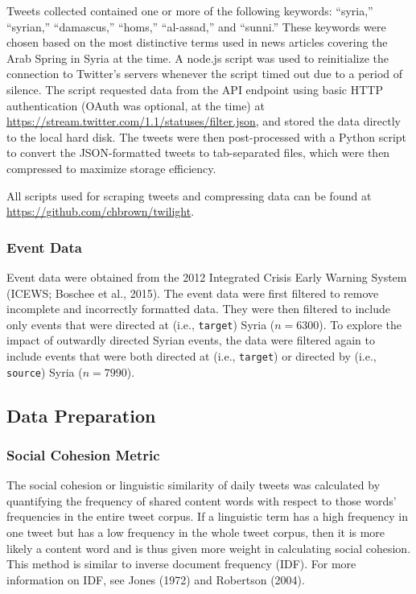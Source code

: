 \documentclass[english,man]{apa6}
\begin{document}
Tweets collected contained one or more of the following keywords:
\enquote{syria,} \enquote{syrian,} \enquote{damascus,} \enquote{homs,} \enquote{al-assad,} and \enquote{sunni.} These
keywords were chosen based on the most distinctive terms used in news
articles covering the Arab Spring in Syria at the time. A node.js script
was used to reinitialize the connection to Twitter's servers whenever the
script timed out due to a period of silence. The script requested data from
the API endpoint using basic HTTP authentication (OAuth was optional, at
the time) at \url{https://stream.twitter.com/1.1/statuses/filter.json}, and stored
the data directly to the local hard disk. The tweets were then post-processed
with a Python script to convert the JSON-formatted tweets to tab-separated
files, which were then compressed to maximize storage efficiency.

All scripts used for scraping tweets and compressing data can be found
at \url{https://github.com/chbrown/twilight}.

\hypertarget{event-data}{%
\subsubsection{Event Data}\label{event-data}}

Event data were obtained from the 2012 Integrated Crisis Early Warning
System (ICEWS; Boschee et al., 2015). The event data were first filtered to
remove incomplete and incorrectly formatted data. They were then filtered
to include only events that were directed at (i.e., \texttt{target}) Syria (\(n = 6300\)).
To explore the impact of outwardly directed Syrian events, the data were
filtered again to include events that were both directed at (i.e., \texttt{target})
or directed by (i.e., \texttt{source}) Syria (\(n = 7990\)).

\hypertarget{data-preparation}{%
\subsection{Data Preparation}\label{data-preparation}}

\hypertarget{social-cohesion-metric}{%
\subsubsection{Social Cohesion Metric}\label{social-cohesion-metric}}

The social cohesion or linguistic similarity of daily tweets was calculated
by quantifying the frequency of shared content words with respect to those
words' frequencies in the entire tweet corpus. If a linguistic term has a
high frequency in one tweet but has a low frequency in the whole tweet
corpus, then it is more likely a content word and is thus given more weight
in calculating social cohesion.
This method is similar to inverse document frequency (IDF).
For more information on IDF, see Jones (1972) and
Robertson (2004).
\end{document}
